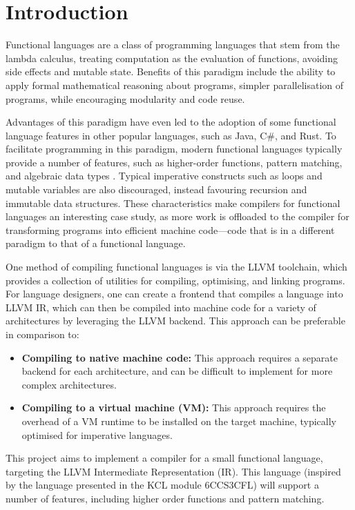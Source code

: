 \chapter{Introduction}

Functional languages are a class of programming languages that stem from the lambda calculus,
treating computation as the evaluation of functions, avoiding side effects and mutable state.
Benefits of this paradigm include the ability to apply formal mathematical reasoning about programs,
simpler parallelisation of programs, while encouraging modularity and code reuse.

Advantages of this paradigm have even led to the adoption of some functional language features in
other popular languages, such as Java, C\#, and Rust. To facilitate programming in this paradigm,
modern functional languages typically provide a number of features, such as higher-order functions,
pattern matching, and algebraic data types \autocite{hudak1989conception}. Typical imperative
constructs such as loops and mutable variables are also discouraged, instead favouring recursion and
immutable data structures. These characteristics make compilers for functional languages an
interesting case study, as more work is offloaded to the compiler for transforming programs into
efficient machine code---code that is in a different paradigm to that of a functional language.

One method of compiling functional languages is via the LLVM toolchain, which provides a collection
of utilities for compiling, optimising, and linking programs. For language designers, one can create
a frontend that compiles a language into LLVM IR, which can then be compiled into machine code for a
variety of architectures by leveraging the LLVM backend. This approach can be preferable in
comparison to:

\begin{itemize}
    \item \textbf{Compiling to native machine code:} This approach requires a separate backend for
          each architecture, and can be difficult to implement for more complex architectures.
    \item \textbf{Compiling to a virtual machine (VM):} This approach requires the overhead of a VM
          runtime to be installed on the target machine, typically optimised for imperative
          languages.
\end{itemize}

This project aims to implement a compiler for a small functional language, targeting the LLVM
Intermediate Representation (IR). This language (inspired by the language presented in the KCL
module 6CCS3CFL) will support a number of features, including higher order functions and pattern
matching.

